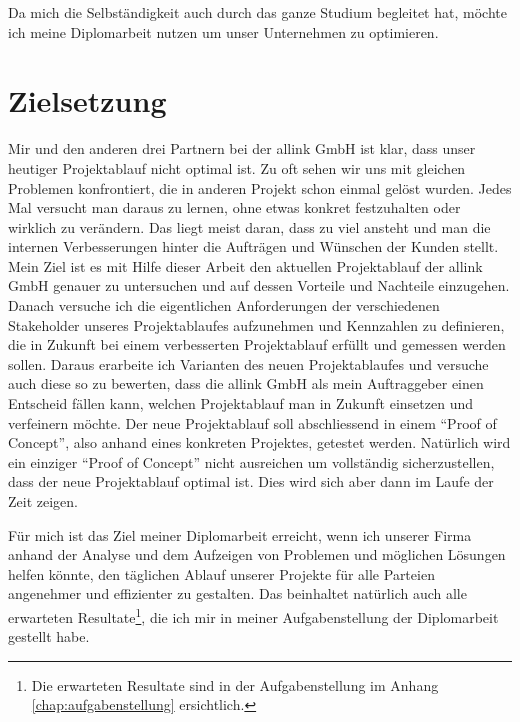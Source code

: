 Da mich die Selbständigkeit auch durch das ganze Studium begleitet hat, möchte 
ich meine Diplomarbeit nutzen um unser Unternehmen zu optimieren.

\section{Zielsetzung}
Mir und den anderen drei Partnern bei der allink GmbH ist klar, dass unser
heutiger Projektablauf nicht optimal ist. Zu oft sehen wir uns mit gleichen
Problemen konfrontiert, die in anderen Projekt schon einmal gelöst wurden.
Jedes Mal versucht man daraus zu lernen, ohne etwas konkret festzuhalten oder
wirklich zu verändern. Das liegt meist daran, dass zu viel ansteht und man
die internen Verbesserungen hinter die Aufträgen und Wünschen der Kunden
stellt.
Mein Ziel ist es mit Hilfe dieser Arbeit den aktuellen Projektablauf der
allink GmbH genauer zu untersuchen und auf dessen Vorteile und Nachteile einzugehen.
Danach versuche ich die eigentlichen Anforderungen der verschiedenen Stakeholder
unseres Projektablaufes aufzunehmen und Kennzahlen zu definieren, die in Zukunft
bei einem verbesserten Projektablauf erfüllt und gemessen werden sollen.
Daraus erarbeite ich Varianten des neuen Projektablaufes und versuche auch
diese so zu bewerten, dass die allink GmbH als mein Auftraggeber einen
Entscheid fällen kann, welchen Projektablauf man in Zukunft einsetzen und 
verfeinern möchte. Der neue Projektablauf soll abschliessend in einem ``Proof of Concept'', also
anhand eines konkreten Projektes, getestet werden. Natürlich wird ein einziger
``Proof of Concept'' nicht ausreichen um vollständig sicherzustellen, dass der
neue Projektablauf optimal ist. Dies wird sich aber dann im Laufe der Zeit zeigen.

Für mich ist das Ziel meiner Diplomarbeit erreicht, wenn ich unserer Firma anhand der Analyse und
dem Aufzeigen von Problemen und möglichen Lösungen helfen könnte, den täglichen
Ablauf unserer Projekte für alle Parteien angenehmer und effizienter zu gestalten.
Das beinhaltet natürlich auch alle erwarteten Resultate\footnote{Die erwarteten 
Resultate sind in der Aufgabenstellung im Anhang \ref{chap:aufgabenstellung} ersichtlich.}, die ich mir in meiner
Aufgabenstellung der Diplomarbeit gestellt habe.

